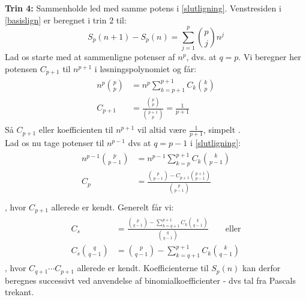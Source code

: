 {\bf Trin 4:} Sammenholde led med samme potens i \ref{slutligning}.
Venstresiden i  \ref{basislign} er beregnet i trin \(2\) til:
\[S_p(n+1)-S_p(n)=\sum_{j=1}^{p}\binom{p}{j}n^j\]
Lad os starte med at sammenligne potenser af \(n^p\), dvs. at \(q=p\). Vi beregner her potensen \(C_{p+1}\) til \(n^{p+1}\) i løsningspolynomiet og får:
\begin{align}
\begin{split}
n^p\binom{p}{p}&=n^p\sum_{k=p+1}^{p+1}C_{k}\binom{k}{p}\\
C_{p+1}&=\frac{\binom{p}{p}}{\binom{p+1}{p}}=\frac{1}{p+1}
\end{split}
\end{align}
Så \(C_{p+1}\) eller koefficienten til \(n^{p+1}\) vil altid være \(\frac{1}{p+1}\), simpelt \!.\\
Lad os nu tage potenser til \(n^{p-1}\) dvs at \(q=p-1\) i \ref{slutligning}:
\begin{align}
\begin{split}
n^{p-1}\binom{p}{p-1}&=n^{p-1}\sum_{k=p}^{p+1}C_{k}\binom{k}{p-1}\\
C_{p}&=\frac{\binom{p}{p-1}-C_{p+1}\binom{p+1}{p-1}}{\binom{p}{p-1}}\\
\end{split}
\end{align}
, hvor \(C_{p+1}\) allerede er kendt.
Generelt får vi:
\begin{align}
\begin{split}
C_{s}&=\frac{\binom{p}{q-1}-\sum_{k=q+1}^{p+1}C_{k}\binom{k}{q-1}}{\binom{q}{q-1}} \qquad \text{eller}\\
C_{s}\binom{q}{q-1}&=\binom{p}{q-1}-\sum_{k=q+1}^{p+1}C_{k}\binom{k}{q-1}\label{iterligning}
\end{split}
\end{align}
, hvor \(C_{q+1} \dotsb C_{p+1}\) allerede er kendt.
Koefficienterne til \(S_{p}(n)\) kan derfor beregnes successivt ved anvendelse af binomialkoefficienter - dvs tal fra Pascals trekant.
